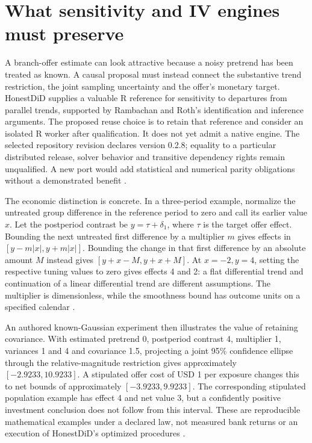 \hypertarget{what-sensitivity-and-iv-engines-must-preserve}{%
\section{What sensitivity and IV engines must
preserve}\label{what-sensitivity-and-iv-engines-must-preserve}}

A branch-offer estimate can look attractive because a noisy pretrend has
been treated as known. A causal proposal must instead connect the
substantive trend restriction, the joint sampling uncertainty and the
offer's monetary target. HonestDiD supplies a valuable R reference for
sensitivity to departures from parallel trends, supported by Rambachan
and Roth's identification and inference arguments. The proposed reuse
choice is to retain that reference and consider an isolated R worker
after qualification. It does not yet admit a native engine. The selected
repository revision declares version 0.2.8; equality to a particular
distributed release, solver behavior and transitive dependency rights
remain unqualified. A new port would add statistical and numerical
parity obligations without a demonstrated benefit
\citep{rambachan2023,exec22_honestdid_engine}.

The economic distinction is concrete. In a three-period example,
normalize the untreated group difference in the reference period to zero
and call its earlier value \(x\). Let the postperiod contrast be
\(y=\tau+\delta_1\), where \(\tau\) is the target offer effect. Bounding
the next untreated first difference by a multiplier \(m\) gives effects
in \([y-m|x|,y+m|x|]\). Bounding the change in that first difference by
an absolute amount \(M\) instead gives \([y+x-M,y+x+M]\). At
\(x=-2,y=4\), setting the respective tuning values to zero gives effects
4 and 2: a flat differential trend and continuation of a linear
differential trend are different assumptions. The multiplier is
dimensionless, while the smoothness bound has outcome units on a
specified calendar \citep{rambachan2023,exec22_honestdid_reference}.

An authored known-Gaussian experiment then illustrates the value of
retaining covariance. With estimated pretrend 0, postperiod contrast 4,
multiplier 1, variances 1 and 4 and covariance 1.5, projecting a joint
95\% confidence ellipse through the relative-magnitude restriction gives
approximately \([-2.9233,10.9233]\). A stipulated offer cost of USD 1
per exposure changes this to net bounds of approximately
\([-3.9233,9.9233]\). The corresponding stipulated population example
has effect 4 and net value 3, but a confidently positive investment
conclusion does not follow from this interval. These are reproducible
mathematical examples under a declared law, not measured bank returns or
an execution of HonestDiD's optimized procedures
\citep{exec22_honestdid_reference}.

